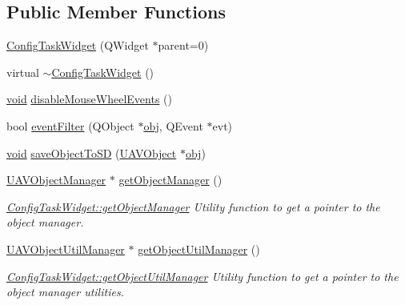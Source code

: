 \subsection*{Public Member Functions}
\begin{DoxyCompactItemize}
\item 
\hyperlink{group___u_a_v_object_widget_utils_ga8164338f4928bd3afd984eeda276f276}{Config\-Task\-Widget} (Q\-Widget $\ast$parent=0)
\item 
virtual \hyperlink{group___u_a_v_object_widget_utils_ga40fc17c487f66c2cbcd9aa678c6f20dd}{$\sim$\-Config\-Task\-Widget} ()
\item 
\hyperlink{group___u_a_v_objects_plugin_ga444cf2ff3f0ecbe028adce838d373f5c}{void} \hyperlink{group___u_a_v_object_widget_utils_gaf42e971c9cd69919e3b05ed25643d516}{disable\-Mouse\-Wheel\-Events} ()
\item 
bool \hyperlink{group___u_a_v_object_widget_utils_gae5859445d40d8a43d5fd91927dd56ba9}{event\-Filter} (Q\-Object $\ast$\hyperlink{glext_8h_a0c0d4701a6c89f4f7f0640715d27ab26}{obj}, Q\-Event $\ast$evt)
\item 
\hyperlink{group___u_a_v_objects_plugin_ga444cf2ff3f0ecbe028adce838d373f5c}{void} \hyperlink{group___u_a_v_object_widget_utils_ga48cc77073a67c1e1945a0625f27d1519}{save\-Object\-To\-S\-D} (\hyperlink{class_u_a_v_object}{U\-A\-V\-Object} $\ast$\hyperlink{glext_8h_a0c0d4701a6c89f4f7f0640715d27ab26}{obj})
\item 
\hyperlink{class_u_a_v_object_manager}{U\-A\-V\-Object\-Manager} $\ast$ \hyperlink{group___u_a_v_object_widget_utils_ga516ee05a73ac3c7c9e6132b0d7294b4a}{get\-Object\-Manager} ()
\begin{DoxyCompactList}\small\item\em \hyperlink{group___u_a_v_object_widget_utils_ga516ee05a73ac3c7c9e6132b0d7294b4a}{Config\-Task\-Widget\-::get\-Object\-Manager} Utility function to get a pointer to the object manager. \end{DoxyCompactList}\item 
\hyperlink{class_u_a_v_object_util_manager}{U\-A\-V\-Object\-Util\-Manager} $\ast$ \hyperlink{group___u_a_v_object_widget_utils_gadefdec77400ea7aaed02de03fa044b7a}{get\-Object\-Util\-Manager} ()
\begin{DoxyCompactList}\small\item\em \hyperlink{group___u_a_v_object_widget_utils_gadefdec77400ea7aaed02de03fa044b7a}{Config\-Task\-Widget\-::get\-Object\-Util\-Manager} Utility function to get a pointer to the object manager utilities. \end{DoxyCompactList}\item 

\end{DoxyCompactItemize}
